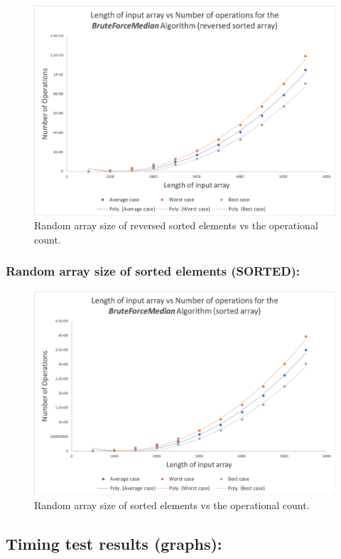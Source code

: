 \documentclass[12pt]{article}
\begin{document}
\begin{figure}[H]
	\centering
	\includegraphics[width=0.9\linewidth]{Results/OpsReversed}
	\caption{Random array size of reversed sorted elements vs the operational count.}
	\label{fig:opsreversed}
\end{figure}


\subsubsection{Random array size of sorted elements (SORTED): }

\begin{figure}[H]
	\centering
	\includegraphics[width=0.9\linewidth]{Results/OpsSorted}
	\caption{Random array size of sorted elements vs the operational count.}
	\label{fig:opssorted}
\end{figure}

\subsection{Timing test results (graphs): }
\end{document}
